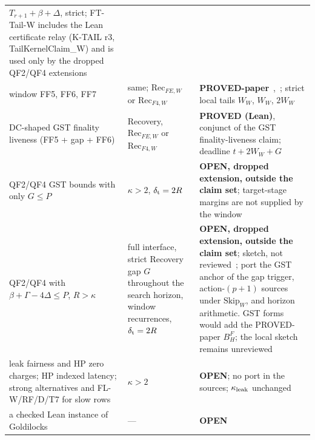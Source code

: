 \documentclass{article}
\theoremstyle{plain}
\theoremstyle{definition}
\theoremstyle{remark}
\newcommand{\OPEN}{\textbf{OPEN}}
\begin{document}
\begin{center}
\begin{longtable}{>{\raggedright\arraybackslash}p{5.4cm}
  >{\raggedright\arraybackslash}p{1.9cm}
  >{\raggedright\arraybackslash}p{5.6cm}}
  $T_{r+1}+\beta+\Delta$, strict; FT-Tail-W includes the Lean
  certificate relay (K-TAIL r3, \textsf{TailKernelClaim\_W}) and is
  used only by the dropped QF2/QF4 extensions\\
window FF5, FF6, FF7 & same; $\mathrm{Rec}_{FE,W}$ or $\mathrm{Rec}_{F4,W}$ &
  \textbf{PROVED-paper}~\cite[\S5]{FW},~\cite[FF5--FF7]{BPF}; strict local tails $W_W$, $W_W$, $2W_W$\\
DC-shaped GST finality liveness (FF5 + gap + FF6) & Recovery, $\mathrm{Rec}_{FE,W}$ or $\mathrm{Rec}_{F4,W}$ &
  \textbf{PROVED (Lean)}, conjunct of the GST finality-liveness claim; deadline $t+2W_W+G$\\
QF2/QF4 GST bounds with only $G\leq P$ & $\kappa>2$,
  $\delta_{\rm t}=2R$ & \textbf{OPEN, dropped extension, outside the claim set}; target-stage margins are not supplied
  by the window~\cite[\S5]{FW}\\
QF2/QF4 with $\beta+\Gamma-4\Delta\leq P$, $R>\kappa$ & full interface,
  strict Recovery gap $G$ throughout the search horizon, window recurrences,
  $\delta_{\rm t}=2R$ &
  \textbf{OPEN, dropped extension, outside the claim set}; sketch, not reviewed~\cite[\S5]{FW}; port the GST anchor of the
  gap trigger, action-$(p+1)$ sources under $\mathrm{Skip}_W$, and horizon
  arithmetic.  GST forms would add the PROVED-paper $B_H^F$; the local sketch remains unreviewed\\
leak fairness and HP zero charges; HP indexed latency;
  strong alternatives and FL-W/RF/D/T7 for slow rows & $\kappa>2$ &
  \OPEN; no port in the sources; $\kappa_{\rm leak}$ unchanged~\cite[F5]{FPR}\\
a checked Lean instance of Goldilocks & --- & \OPEN\\
\hline
\end{longtable}
\end{center}
\end{document}
